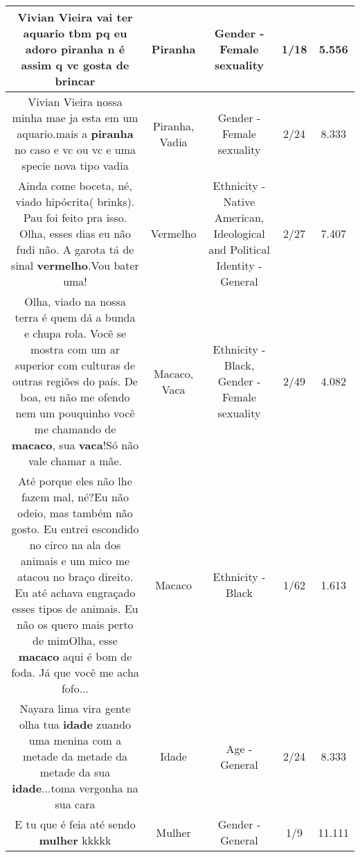 \documentclass[11pt]{article}
\newlength\mylength
\begin{document}
\begin{center}
\begin{longtable}{|C{.65\mylength}|C{.30\mylength}|C{.12\mylength}|C{.12\mylength}|C{.12\mylength}|}
  \small Vivian Vieira vai ter aquario tbm pq eu adoro \textbf{piranha} n é assim q vc gosta de brincar\normalsize   & Piranha & Gender - Female sexuality & 1/18 & 5.556 \\  \hline
  \small Vivian Vieira nossa minha mae ja esta em um aquario.mais a \textbf{piranha} no caso e vc ou vc e uma specie nova tipo vadia\normalsize   & Piranha, Vadia & Gender - Female sexuality & 2/24 & 8.333 \\  \hline
  \small Ainda come boceta, né, viado hipócrita( brinks). Pau foi feito pra isso. Olha, esses dias eu não fudi não. A garota tá de sinal \textbf{v\textbf{ermelho}}.Vou bater uma!\normalsize   & Vermelho & Ethnicity - Native American, Ideological and Political Identity - General & 2/27 & 7.407 \\  \hline
  \small Olha, viado na nossa terra é quem dá a bunda e chupa rola. Você se mostra com um ar superior com culturas de outras regiões do país. De boa, eu não me ofendo nem um pouquinho você me chamando de \textbf{macaco}, sua \textbf{vaca}!Só não vale chamar a mãe.\normalsize   & Macaco, Vaca & Ethnicity - Black, Gender - Female sexuality & 2/49 & 4.082 \\  \hline
  \small Até porque eles não lhe fazem mal, né?Eu não odeio, mas também não gosto. Eu entrei escondido no circo na ala dos animais e um mico me atacou no braço direito. Eu até achava engraçado esses tipos de animais. Eu não os quero mais perto de mimOlha, esse \textbf{macaco} aqui é bom de foda. Já que você me acha fofo...\normalsize   & Macaco & Ethnicity - Black & 1/62 & 1.613 \\  \hline
  \small Nayara lima vira gente olha tua \textbf{idade} zuando uma menina com a metade da metade da metade da sua \textbf{idade}...toma vergonha na sua cara\normalsize   & Idade & Age - General & 2/24 & 8.333 \\  \hline
  \small E tu que é feia até sendo \textbf{mulher} kkkkk\normalsize   & Mulher & Gender - General & 1/9 & 11.111 \\  \hline

\end{longtable}
\end{center}
\end{document}
